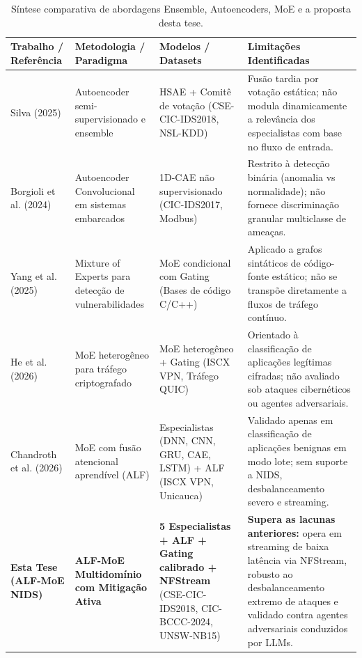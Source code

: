 \begin{table}[htbp]
\centering
\footnotesize
\caption{Síntese comparativa de abordagens Ensemble, Autoencoders, MoE e a proposta desta tese.}
\label{quadro:comparativo_ensemble_moe_trabalhos}
\begin{tabularx}{\textwidth}{|>{\raggedright\arraybackslash}p{2.6cm}|>{\raggedright\arraybackslash}p{3.2cm}|>{\raggedright\arraybackslash}p{2.8cm}|>{\raggedright\arraybackslash}X|}
\hline
\textbf{Trabalho / Referência} & \textbf{Metodologia / Paradigma} & \textbf{Modelos / Datasets} & \textbf{Limitações Identificadas} \\
\hline
Silva (2025) \cite{hsae2025} & Autoencoder semi-supervisionado e ensemble & HSAE + Comitê de votação \newline (CSE-CIC-IDS2018, NSL-KDD) & Fusão tardia por votação estática; não modula dinamicamente a relevância dos especialistas com base no fluxo de entrada. \\
\hline
Borgioli et al. (2024) \cite{borgioli2024cae} & Autoencoder Convolucional em sistemas embarcados & 1D-CAE não supervisionado \newline (CIC-IDS2017, Modbus) & Restrito à detecção binária (anomalia vs normalidade); não fornece discriminação granular multiclasse de ameaças. \\
\hline
Yang et al. (2025) \cite{moevd2025} & Mixture of Experts para detecção de vulnerabilidades & MoE condicional com Gating \newline (Bases de código C/C++) & Aplicado a grafos sintáticos de código-fonte estático; não se transpõe diretamente a fluxos de tráfego contínuo. \\
\hline
He et al. (2026) \cite{trafficmoe2026} & MoE heterogêneo para tráfego criptografado & MoE heterogêneo + Gating \newline (ISCX VPN, Tráfego QUIC) & Orientado à classificação de aplicações legítimas cifradas; não avaliado sob ataques cibernéticos ou agentes adversariais. \\
\hline
Chandroth et al. (2026) \cite{alfmoe2026} & MoE com fusão atencional aprendível (ALF) & 5 Especialistas (DNN, CNN, GRU, CAE, LSTM) + ALF \newline (ISCX VPN, Unicauca) & Validado apenas em classificação de aplicações benignas em modo lote; sem suporte a NIDS, desbalanceamento severo e streaming. \\
\hline
\textbf{Esta Tese (ALF-MoE NIDS)} & \textbf{ALF-MoE Multidomínio com Mitigação Ativa} & \textbf{5 Especialistas + ALF + Gating calibrado + NFStream} \newline (CSE-CIC-IDS2018, CIC-BCCC-2024, UNSW-NB15) & \textbf{Supera as lacunas anteriores:} opera em streaming de baixa latência via NFStream, robusto ao desbalanceamento extremo de ataques e validado contra agentes adversariais conduzidos por LLMs. \\
\hline
\end{tabularx}
\end{table}

